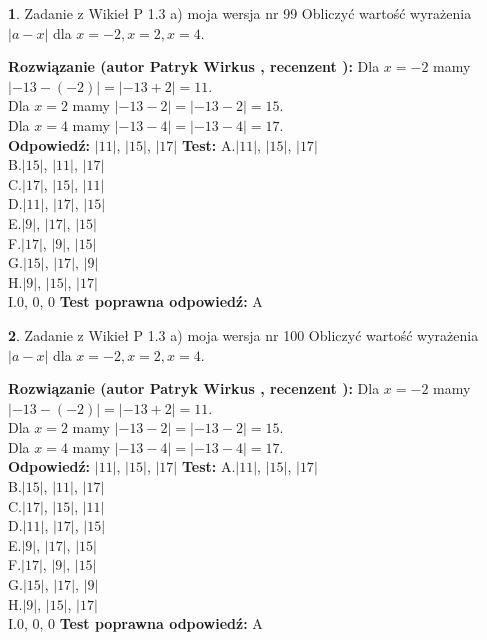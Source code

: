 \documentclass[12pt, a4paper]{article}
\theoremstyle{definition} %
\newtheorem{zad}{}
\newcommand{\zadStart}[1]{\begin{zad}#1\newline}
\newcommand{\zadStop}{\end{zad}}
\newcommand{\rozwStart}[2]{\noindent \textbf{Rozwiązanie (autor #1 , recenzent #2): }\newline}
\newcommand{\rozwStop}{\newline}
\newcommand{\odpStart}{\noindent \textbf{Odpowiedź:}\newline}
\newcommand{\odpStop}{\newline}
\newcommand{\testStart}{\noindent \textbf{Test:}\newline}
\newcommand{\testStop}{\newline}
\newcommand{\kluczStart}{\noindent \textbf{Test poprawna odpowiedź:}\newline}
\newcommand{\kluczStop}{\newline}
\begin{document}
\zadStart{Zadanie z Wikieł P 1.3 a) moja wersja nr 99}
Obliczyć wartość wyrażenia $|a - x|$ dla $x=-2,x=2,x=4$.
\zadStop
\rozwStart{Patryk Wirkus}{}
Dla $x = -2$ mamy $|-13 - (-2)| = |-13 + 2| = 11$.\\
Dla $x = 2$ mamy $|-13 - 2| = |-13 - 2| = 15$.\\
Dla $x = 4$ mamy $|-13 - 4| = |-13 - 4| = 17$.\\
\rozwStop
\odpStart
$|11|$, $|15|$, $|17|$
\odpStop
\testStart
A.$|11|$, $|15|$, $|17|$\\
B.$|15|$, $|11|$, $|17|$\\
C.$|17|$, $|15|$, $|11|$\\
D.$|11|$, $|17|$, $|15|$\\
E.$|9|$, $|17|$, $|15|$\\
F.$|17|$, $|9|$, $|15|$\\
G.$|15|$, $|17|$, $|9|$\\
H.$|9|$, $|15|$, $|17|$\\
I.$0$, $0$, $0$
\testStop
\kluczStart
A
\kluczStop



\zadStart{Zadanie z Wikieł P 1.3 a) moja wersja nr 100}
Obliczyć wartość wyrażenia $|a - x|$ dla $x=-2,x=2,x=4$.
\zadStop
\rozwStart{Patryk Wirkus}{}
Dla $x = -2$ mamy $|-13 - (-2)| = |-13 + 2| = 11$.\\
Dla $x = 2$ mamy $|-13 - 2| = |-13 - 2| = 15$.\\
Dla $x = 4$ mamy $|-13 - 4| = |-13 - 4| = 17$.\\
\rozwStop
\odpStart
$|11|$, $|15|$, $|17|$
\odpStop
\testStart
A.$|11|$, $|15|$, $|17|$\\
B.$|15|$, $|11|$, $|17|$\\
C.$|17|$, $|15|$, $|11|$\\
D.$|11|$, $|17|$, $|15|$\\
E.$|9|$, $|17|$, $|15|$\\
F.$|17|$, $|9|$, $|15|$\\
G.$|15|$, $|17|$, $|9|$\\
H.$|9|$, $|15|$, $|17|$\\
I.$0$, $0$, $0$
\testStop
\kluczStart
A
\kluczStop
\end{document}
